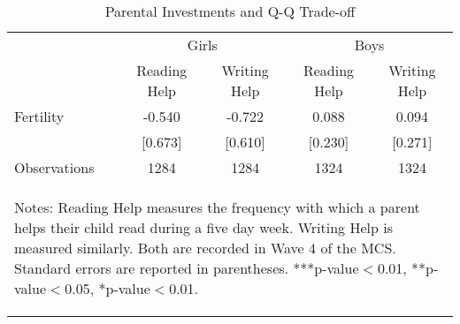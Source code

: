 \begin{table}[htbp]\centering
\def\sym#1{\ifmmode^{#1}\else\(^{#1}\)\fi}
\caption{Parental Investments and Q-Q Trade-off}
\begin{tabular}{l*{4}{c}}
\toprule
                    &\multicolumn{2}{c}{Girls}      &\multicolumn{2}{c}{Boys}       \\\cmidrule(lr){2-3}\cmidrule(lr){4-5}
                    &Reading Help   &Writing Help   &Reading Help   &Writing Help   \\
\midrule
Fertility           &      -0.540   &      -0.722   &       0.088   &       0.094   \\
                    &     [0.673]   &     [0.610]   &     [0.230]   &     [0.271]   \\
\midrule
Observations        &        1284   &        1284   &        1324   &        1324   \\
\bottomrule\multicolumn{5}{p{14.6cm}}{\begin{footnotesize}        
Notes: Reading Help measures the frequency with which a parent helps their child read during a five day week. Writing Help is measured similarly. Both are recorded in Wave 4 of the MCS. Standard errors are reported in parentheses. ***p-value$<$0.01, **p-value$<$0.05, *p-value$<$0.01.                                
\end{footnotesize}}\end{tabular}\end{table}
